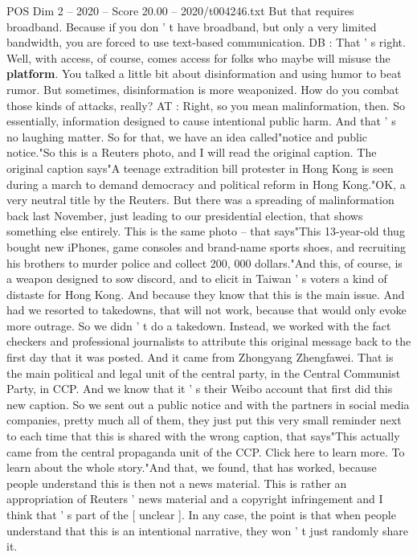 \begin{textsample}{POS Dim 2 – 2020 – Score 20.00 – 2020/t004246.txt}
But that requires broadband.
Because if you don ' t have broadband, but only a very limited bandwidth, you are forced to use text-based communication.
DB : That ' s right.
Well, with access, of course, comes access for folks who maybe will misuse the \textbf{platform}.
You talked a little bit about disinformation and using humor to beat rumor.
But sometimes, disinformation is more weaponized.
How do you combat those kinds of attacks, really?
AT : Right, so you mean malinformation, then.
So essentially, information designed to cause intentional public harm.
And that ' s no laughing matter.
So for that, we have an idea called"notice and public notice."So this is a Reuters photo, and I will read the original caption.
The original caption says"A teenage extradition bill protester in Hong Kong is seen during a march to demand democracy and political reform in Hong Kong."OK, a very neutral title by the Reuters.
But there was a spreading of malinformation back last November, just leading to our presidential election, that shows something else entirely.
This is the same photo -- that says"This 13-year-old thug bought new iPhones, game consoles and brand-name sports shoes, and recruiting his brothers to murder police and collect 200, 000 dollars."And this, of course, is a weapon designed to sow discord, and to elicit in Taiwan ' s voters a kind of distaste for Hong Kong.
And because they know that this is the main issue.
And had we resorted to takedowns, that will not work, because that would only evoke more outrage.
So we didn ' t do a takedown.
Instead, we worked with the fact checkers and professional journalists to attribute this original message back to the first day that it was posted.
And it came from Zhongyang Zhengfawei.
That is the main political and legal unit of the central party, in the Central Communist Party, in CCP.
And we know that it ' s their Weibo account that first did this new caption.
So we sent out a public notice and with the partners in social media companies, pretty much all of them, they just put this very small reminder next to each time that this is shared with the wrong caption, that says"This actually came from the central propaganda unit of the CCP.
Click here to learn more.
To learn about the whole story."And that, we found, that has worked, because people understand this is then not a news material.
This is rather an appropriation of Reuters ' news material and a copyright infringement and I think that ' s part of the [ unclear ].
In any case, the point is that when people understand that this is an intentional narrative, they won ' t just randomly share it.

\end{textsample}
